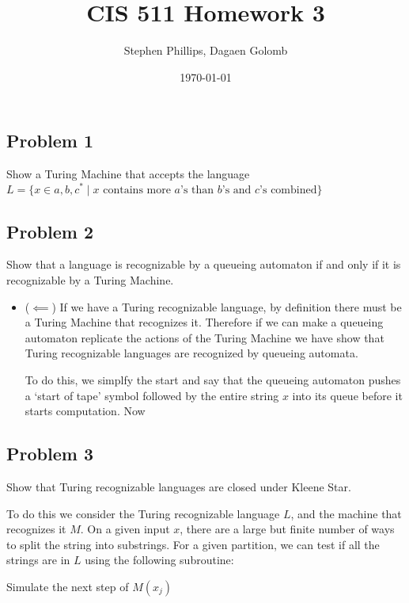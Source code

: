 \documentclass[english]{article}
\title{CIS 511 Homework 3}
\author{Stephen Phillips, Dagaen Golomb}
\date{\today }
\begin{document}
\maketitle
\subsection*{Problem 1}
Show a Turing Machine that accepts the language
 $L = \{ x \in {a,b,c}^* \mid 
         \textrm{$x$ contains more $a$'s than $b$'s and $c$'s combined} \}$



\subsection*{Problem 2}
Show that a language is recognizable by a queueing automaton if and only if it
is recognizable by a Turing Machine.
\begin{itemize}
\item ($ \impliedby $) If we have a Turing recognizable language, by
  definition there must be a Turing Machine that recognizes it. Therefore if
  we can make a queueing automaton replicate the actions of the Turing Machine
  we have show that Turing recognizable languages are recognized by queueing
  automata.

  To do this, we simplfy the start and say that the queueing automaton pushes
  a `start of tape' symbol followed by the entire string $x$ into its queue before
  it starts computation. Now
\end{itemize}

\subsection*{Problem 3}
Show that Turing recognizable languages are closed under Kleene Star.

To do this we consider the Turing recognizable language $L$, and the machine
that recognizes it $M$.
On a given input $x$, there are a large but finite number of ways to split the
string into substrings. For a given partition, we can test if all the strings
are in $L$ using the following subroutine:
\begin{algorithmic}
	\State {}
		\State Simulate the next step of $M(x_j)$
	\EndFor
\EndFor
\EndFunction 
\end{algorithmic}
\end{document}
